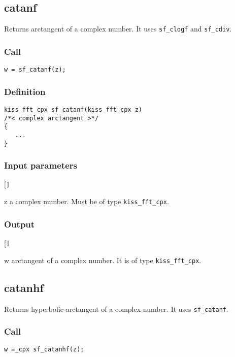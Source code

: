 \subsection{{catanf}}
Returns arctangent of a complex number. It uses \texttt{sf\_clogf} and \texttt{sf\_cdiv}.

\subsubsection*{Call}
\begin{verbatim}w = sf_catanf(z);\end{verbatim}

\subsubsection*{Definition}
\begin{verbatim}
kiss_fft_cpx sf_catanf(kiss_fft_cpx z)
/*< complex arctangent >*/
{
   ...   
}     
\end{verbatim}

\subsubsection*{Input parameters}
\begin{desclist}{\tt }{\quad}[\tt ]
   \setlength\itemsep{0pt}
   \item[z] a complex number. Must be of type \texttt{kiss\_fft\_cpx}.
\end{desclist}

\subsubsection*{Output}
\begin{desclist}{\tt }{\quad}[\tt ]
   \setlength\itemsep{0pt}
   \item[w] arctangent of a complex number. It is of type \texttt{kiss\_fft\_cpx}.
\end{desclist}



\subsection{{catanhf}}
Returns hyperbolic arctangent of a complex number. It uses \texttt{sf\_catanf}.

\subsubsection*{Call}
\begin{verbatim}w =_cpx sf_catanhf(z);\end{verbatim}

